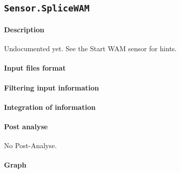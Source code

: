 
\subsection{\texttt{Sensor.SpliceWAM}}

\paragraph{Description}

Undocumented yet. See the Start WAM sensor for hints.

\paragraph{Input files format}

\paragraph{Filtering input information}


\paragraph{Integration of information}


\paragraph{Post analyse}

No Post-Analyse.

\paragraph{Graph}

